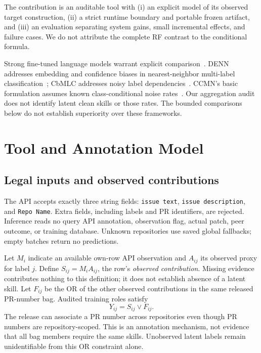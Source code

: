 \documentclass[10pt,conference]{IEEEtran}
\begin{document}
The contribution is an auditable tool with (i) an explicit model of its observed target construction, (ii) a strict runtime boundary and portable frozen artifact, and (iii) an evaluation separating system gains, small incremental effects, and failure cases. We do not attribute the complete RF contrast to the conditional formula.

Strong fine-tuned language models warrant explicit comparison~\cite{survey}. DENN addresses embedding and confidence biases in nearest-neighbor multi-label classification~\cite{denn}; CbMLC addresses noisy label dependencies~\cite{cbmlc}. CCMN's basic formulation assumes known class-conditional noise rates~\cite{ccmn}. Our aggregation audit does not identify latent clean skills or those rates. The bounded comparisons below do not establish superiority over these frameworks.

\section{Tool and Annotation Model}
\subsection{Legal inputs and observed contributions}
The API accepts exactly three string fields: \texttt{issue text}, \texttt{issue description}, and \texttt{Repo Name}. Extra fields, including labels and PR identifiers, are rejected. Inference reads no query API annotation, observation flag, actual patch, peer outcome, or training database. Unknown repositories use saved global fallbacks; empty batches return no predictions.

Let $M_i$ indicate an available own-row API observation and $A_{ij}$ its observed proxy for label $j$. Define $S_{ij}=M_iA_{ij}$, the row's \emph{observed contribution}. Missing evidence contributes nothing to this definition; it does not establish absence of a latent skill. Let $F_{ij}$ be the OR of the other observed contributions in the same released PR-number bag. Audited training roles satisfy
\begin{equation}
Y_{ij}=S_{ij}\lor F_{ij}. \label{eq:or}
\end{equation}
The release can associate a PR number across repositories even though PR numbers are repository-scoped. This is an annotation mechanism, not evidence that all bag members require the same skills. Unobserved latent labels remain unidentifiable from this OR constraint alone.
\end{document}
